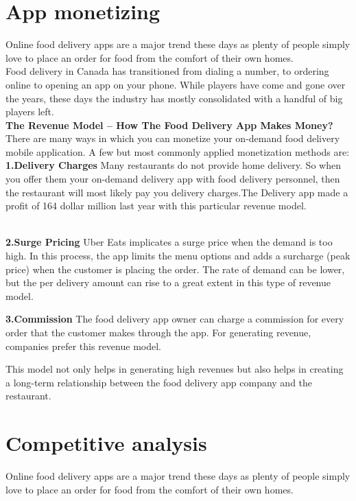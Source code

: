 \documentclass[12pt]{article}
\begin{document}
\section{App monetizing }
Online food delivery apps are a major trend these days as plenty of people simply love to place an order for food from the comfort of their own homes.\\
Food delivery in Canada has transitioned from dialing a number, to ordering online to opening an app on your phone. While players have come and gone over the years, these days the industry has mostly consolidated with a handful of big players left.\\



\textbf{The Revenue Model – How The Food Delivery App Makes Money?}\\
There are many ways in which you can monetize your on-demand food delivery mobile application. A few but most commonly applied monetization methods are:\\
\textbf{
1.Delivery Charges}
Many restaurants do not provide home delivery. So when you offer them your on-demand delivery app with food delivery personnel, then the restaurant will most likely pay you delivery charges.The Delivery app made a profit of 164 dollar million last year with this particular revenue model.

 
\\
\textbf{2.Surge Pricing}
Uber Eats implicates a surge price when the demand is too high. In this process, the app limits the menu options and adds a surcharge (peak price) when the customer is placing the order. The rate of demand can be lower, but the per delivery amount can rise to a great extent in this type of revenue model.
 

\textbf{3.Commission}
The food delivery app owner can charge a commission for every order that the customer makes through the app. For generating revenue, companies prefer this revenue model.

This model not only helps in generating high revenues but also helps in creating a long-term relationship between the food delivery app company and the restaurant.

\section{Competitive analysis}

Online food delivery apps are a major trend these days as plenty of people simply love to place an order for food from the comfort of their own homes.
\end{document}
